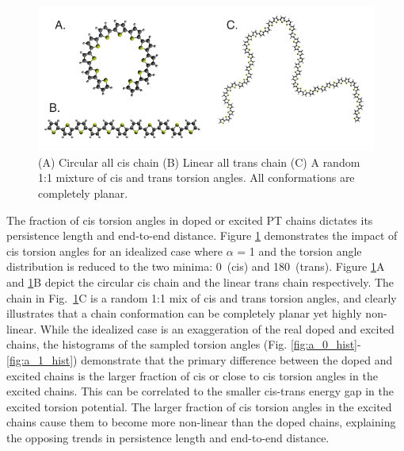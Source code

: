 \begin{figure}[hbt!]
    \centering
    \includegraphics{figures/chap2/planar_chains.pdf}
    \caption[Idealized Cis, Trans, and Mixed Chain Conformations]{(A) Circular all cis chain (B) Linear all trans chain (C) A random 1:1 mixture of cis and trans torsion angles. All conformations are completely planar.}
    \label{fig:ideal}
\end{figure}

The fraction of cis torsion angles in doped or excited PT chains dictates its persistence length and end-to-end distance. Figure \ref{fig:ideal} demonstrates the impact of cis torsion angles for an idealized case where $\alpha$ = 1 and the torsion angle distribution is reduced to the two minima: 0\textdegree \ (cis) and 180\textdegree \ (trans). Figure \ref{fig:ideal}A and \ref{fig:ideal}B depict the circular cis chain and the linear trans chain respectively. The chain in Fig.~\ref{fig:ideal}C is a random 1:1 mix of cis and trans torsion angles, and clearly illustrates that a chain conformation can be completely planar yet highly non-linear. While the idealized case is an exaggeration of the real doped and excited chains, the histograms of the sampled torsion angles (Fig. \ref{fig:a_0_hist}-\ref{fig:a_1_hist}) demonstrate that the primary difference between the doped and excited chains is the larger fraction of cis or close to cis torsion angles in the excited chains. This can be correlated to the smaller cis-trans energy gap in the excited torsion potential. The larger fraction of cis torsion angles in the excited chains cause them to become more non-linear than the doped chains, explaining the opposing trends in persistence length and end-to-end distance.

